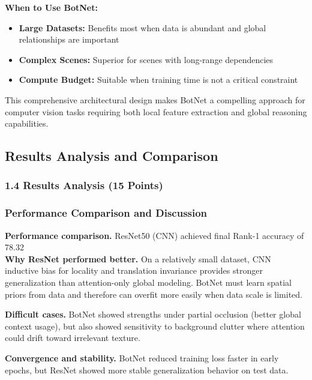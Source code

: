 \documentclass[a4paper,12pt]{article}
\begin{document}
\textbf{When to Use BotNet:}
\begin{itemize}
    \item \textbf{Large Datasets:} Benefits most when data is abundant and global relationships are important
    \item \textbf{Complex Scenes:} Superior for scenes with long-range dependencies
    \item \textbf{Compute Budget:} Suitable when training time is not a critical constraint
\end{itemize}

This comprehensive architectural design makes BotNet a compelling approach for computer vision tasks requiring both local feature extraction and global reasoning capabilities.

\subsection{Results Analysis and Comparison}

\subsubsection*{1.4 Results Analysis (15 Points)}


\subsubsection*{Performance Comparison and Discussion}

\textbf{Performance comparison.}
ResNet50 (CNN) achieved final Rank-1 accuracy of 78.32\\%

\textbf{Why ResNet performed better.}
On a relatively small dataset, CNN inductive bias for locality and translation invariance provides stronger generalization than attention-only global modeling. BotNet must learn spatial priors from data and therefore can overfit more easily when data scale is limited.

\textbf{Difficult cases.}
BotNet showed strengths under partial occlusion (better global context usage), but also showed sensitivity to background clutter where attention could drift toward irrelevant texture.

\textbf{Convergence and stability.}
BotNet reduced training loss faster in early epochs, but ResNet showed more stable generalization behavior on test data.
\end{document}
